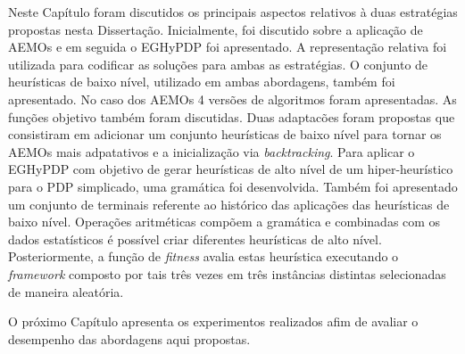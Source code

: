 Neste Capítulo foram discutidos os principais aspectos relativos à duas estratégias propostas nesta Dissertação. Inicialmente, foi discutido sobre a aplicação de AEMOs e em seguida o EGHyPDP foi apresentado. A representação relativa foi utilizada para codificar as soluções para ambas as estratégias. O conjunto de heurísticas de baixo nível, utilizado em ambas abordagens, também foi apresentado. No caso dos AEMOs 4 versões de algoritmos foram apresentadas. As funções objetivo também foram discutidas. Duas adaptacões foram propostas que consistiram em adicionar um conjunto heurísticas de baixo nível para tornar os AEMOs mais adpatativos e a inicialização via \textit{backtracking}. Para aplicar o EGHyPDP com objetivo de gerar heurísticas de alto nível de um  hiper-heurístico para o PDP simplicado, uma  gramática foi desenvolvida. Também foi apresentado um conjunto de terminais referente ao histórico das aplicações das heurísticas de baixo nível. Operações aritméticas compõem a gramática e combinadas com os dados estatísticos é possível criar diferentes heurísticas de alto nível. Posteriormente, a função de \textit{fitness} avalia estas heurística executando o \textit{framework} composto por tais três vezes em três instâncias distintas selecionadas de maneira aleatória.
 
 O próximo Capítulo apresenta os experimentos realizados afim de avaliar o desempenho das abordagens aqui propostas.



